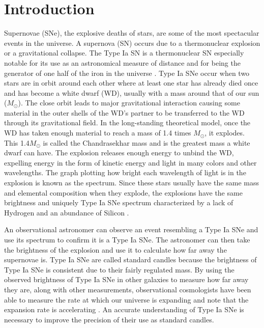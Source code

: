 \documentclass[preprint]{aastex62}
\begin{document}
  

\section{Introduction}


  Supernovae (SNe), the explosive deaths of stars, are some of the most spectacular events in the universe. A supernova (SN) occurs due to a thermonuclear explosion or a gravitational collapse. The Type Ia SN is a thermonuclear SN especially notable for its use as an astronomical measure of distance and for being the generator of one half of the iron in the universe \citep{ironhalfuniverse}. Type Ia SNe occur when two stars are in orbit around each other where at least one star has already died once and has become a white dwarf (WD), usually with a mass around that of our sun ($M_{\odot}$). The close orbit leads to major gravitational interaction causing some material in the outer shells of the WD's partner to be transferred to the WD through its gravitational field. In the long-standing theoretical model, once the WD has taken enough material to reach a mass of 1.4 times $M_{\odot}$, it explodes. This 1.4$M_{\odot}$ is called the Chandrasekhar mass and is the greatest mass a white dwarf can have. The explosion releases enough energy to unbind the WD, expelling energy in the form of kinetic energy and light in many colors and other wavelengths. The graph plotting how bright each wavelength of light is in the explosion is known as the spectrum. Since these stars usually have the same mass and elemental composition when they explode, the explosions have the same brightness and uniquely Type Ia SNe spectrum characterized by a lack of Hydrogen and an abundance of Silicon \citep{SNeSpectra}. 
  
  An observational astronomer can observe an event resembling a Type Ia SNe and use its spectrum to confirm it is a Type Ia SNe. The astronomer can then take the brightness of the explosion and use it to calculate how far away the supernovae is. Type Ia SNe are called standard candles because the brightness of Type Ia SNe is consistent due to their fairly regulated mass. By using the observed brightness of Type Ia SNe in other galaxies to measure how far away they are, along with other measurements, observational cosmologists have been able to measure the rate at which our universe is expanding and note that the expansion rate is accelerating \citep{acceleratingUniverse1, acceleratingUniverse2}. An accurate understanding of Type Ia SNe is necessary to improve the precision of their use as standard candles. 
  
\end{document}
